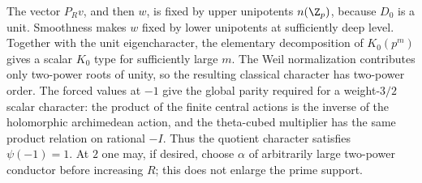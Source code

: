 The vector $P_Rv$, and then $w$, is fixed by upper unipotents
$n(\Z_p)$, because $D_0$ is a unit. Smoothness makes $w$
fixed by lower unipotents at sufficiently deep level. Together with
the unit eigencharacter, the elementary decomposition of
$K_0(p^m)$ gives a scalar $K_0$ type for sufficiently large $m$.
The Weil normalization contributes only two-power roots of unity,
so the resulting classical character has two-power order.
The forced values at $-1$ give the global parity required for a
weight-$3/2$ scalar character: the product of the finite central
actions is the inverse of the holomorphic archimedean action,
and the theta-cubed multiplier has the same product relation
on rational $-I$. Thus the quotient character satisfies
$\psi(-1)=1$. At $2$ one may, if desired, choose
$\alpha$ of arbitrarily large two-power conductor before increasing
$R$; this does not enlarge the prime support.

